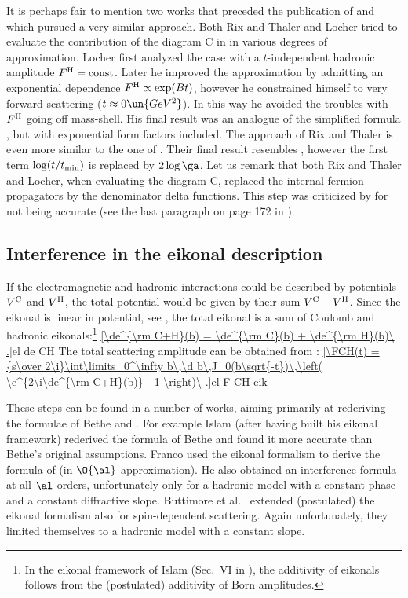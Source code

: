 It is perhaps fair to mention two works that preceded the publication of \WaY{}  and which pursued a very similar approach. Both Rix and Thaler  and Locher  tried to evaluate the contribution of the diagram C in  in various degrees of approximation. Locher first analyzed the case with a $t$-independent hadronic amplitude $F^{\rm H}=\hbox{const}$. Later he improved the approximation by admitting an exponential dependence $F^{\rm H} \propto \exp(Bt)$, however he constrained himself to very forward scattering ($t\approx 0\un{GeV^2}$). In this way he avoided the troubles with $F^{\rm H}$ going off mass-shell. His final result was an analogue of the simplified \WaY{} formula , but with exponential form factors included. The approach of Rix and Thaler is even more similar to the one of \WaY. Their final result resembles , however the first term $\log(t/t_{\rm min})$ is replaced by $2\log\ga$. Let us remark that both Rix and Thaler and Locher, when evaluating the diagram C, replaced the internal fermion propagators by the denominator delta functions. This step was criticized by \WaY{} for not being accurate (see the last paragraph on page 172 in ).



\subsection[int eik]{Interference in the eikonal description}

If the electromagnetic and hadronic interactions could be described by potentials $V^{\rm C}$ and $V^{\rm H}$, the total potential would be given by their sum $V^{\rm C} + V^{\rm H}$. Since the eikonal is linear in potential, see , the total eikonal is a sum of Coulomb and hadronic eikonals:\footnote{%
In the eikonal framework of Islam (Sec.~VI in ), the additivity of eikonals follows from the (postulated) additivity of Born amplitudes.
}
\eqref{\de^{\rm C+H}(b) = \de^{\rm C}(b) + \de^{\rm H}(b)\ .}{el de CH}
The total scattering amplitude can be obtained from :
\eqref{\FCH(t) = {s\over 2\i}\int\limits_0^\infty b\,\d b\,J_0(b\sqrt{-t})\,\left( \e^{2\i\de^{\rm C+H}(b)} - 1 \right)\ .}{el F CH eik}

These steps can be found in a number of works, aiming primarily at rederiving the formulae of Bethe  and \WY{} .
  For example Islam  (after having built his eikonal framework) rederived the formula of Bethe and found it more accurate than Bethe's original assumptions.
  Franco  used the eikonal formalism to derive the formula of \WY{} (in $\O{\al}$ approximation). He also obtained an interference formula at all $\al$ orders, unfortunately only for a hadronic model with a constant phase and a constant diffractive slope.
  Buttimore et al.~ extended (postulated) the eikonal formalism also for spin-dependent scattering. Again unfortunately, they limited themselves to a hadronic model with a constant slope.

